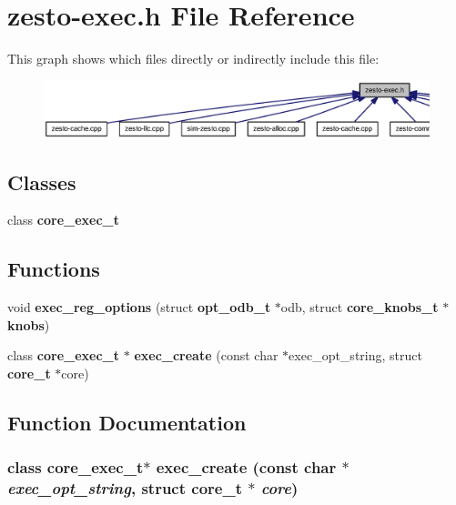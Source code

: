 \section{zesto-exec.h File Reference}
\label{zesto-exec_8h}


This graph shows which files directly or indirectly include this file:\nopagebreak
\begin{figure}[H]
\begin{center}
\leavevmode
\includegraphics[width=420pt]{zesto-exec_8h__dep__incl}
\end{center}
\end{figure}
\subsection*{Classes}
\begin{CompactItemize}
\item 
class {\bf core\_\-exec\_\-t}
\end{CompactItemize}
\subsection*{Functions}
\begin{CompactItemize}
\item 
void {\bf exec\_\-reg\_\-options} (struct {\bf opt\_\-odb\_\-t} $\ast$odb, struct {\bf core\_\-knobs\_\-t} $\ast${\bf knobs})
\item 
class {\bf core\_\-exec\_\-t} $\ast$ {\bf exec\_\-create} (const char $\ast$exec\_\-opt\_\-string, struct {\bf core\_\-t} $\ast$core)
\end{CompactItemize}


\subsection{Function Documentation}
\subsubsection[{exec\_\-create}]{\setlength{\rightskip}{0pt plus 5cm}class {\bf core\_\-exec\_\-t}$\ast$ exec\_\-create (const char $\ast$ {\em exec\_\-opt\_\-string}, \/  struct {\bf core\_\-t} $\ast$ {\em core})}\label{zesto-exec_8h_bc3339106471b5130704c973349de0ee}




